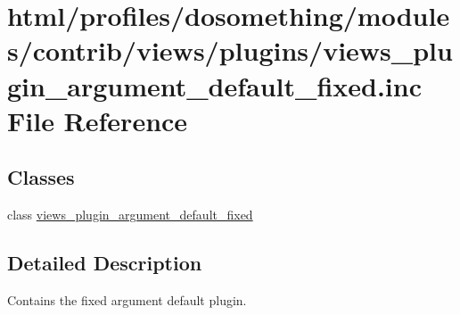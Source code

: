 \hypertarget{views__plugin__argument__default__fixed_8inc}{
\section{html/profiles/dosomething/modules/contrib/views/plugins/views\_\-plugin\_\-argument\_\-default\_\-fixed.inc File Reference}
\label{views__plugin__argument__default__fixed_8inc}
}
\subsection*{Classes}
\begin{DoxyCompactItemize}
\item 
class \hyperlink{classviews__plugin__argument__default__fixed}{views\_\-plugin\_\-argument\_\-default\_\-fixed}
\end{DoxyCompactItemize}


\subsection{Detailed Description}
Contains the fixed argument default plugin. 